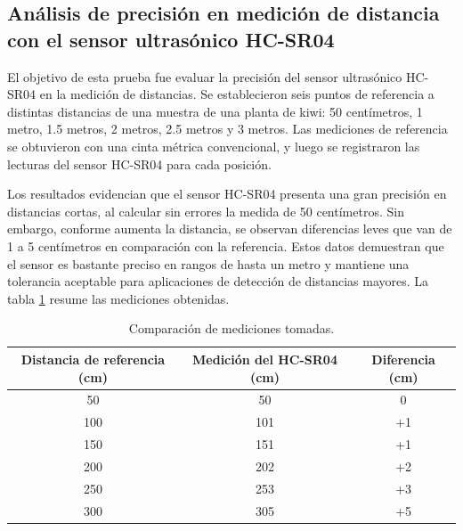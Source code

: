 \vspace{1cm}

\subsection{Análisis de precisión en medición de distancia con el sensor ultrasónico HC-SR04}

El objetivo de esta prueba fue evaluar la precisión del sensor ultrasónico HC-SR04 en la medición de distancias. Se establecieron seis puntos de referencia a distintas distancias de una muestra de una planta de kiwi: 50 centímetros, 1 metro, 1.5 metros, 2 metros, 2.5 metros y 3 metros. Las mediciones de referencia se obtuvieron con una cinta métrica convencional, y luego se registraron las lecturas del sensor HC-SR04 para cada posición.

Los resultados evidencian que el sensor HC-SR04 presenta una gran precisión en distancias cortas, al calcular sin errores la medida de 50 centímetros. Sin embargo, conforme aumenta la distancia, se observan diferencias leves que van de 1 a 5 centímetros en comparación con la referencia. Estos datos demuestran que el sensor es bastante preciso en rangos de hasta un metro y mantiene una tolerancia aceptable para aplicaciones de detección de distancias mayores. La tabla \ref{tab:HCSR04_comparacion} resume las mediciones obtenidas.

\vspace{1cm}

\begin{table}[h]
	\centering
	\caption[Comparación de mediciones tomadas]{Comparación de mediciones tomadas.}
	\begin{tabular}{c c c}    
		\toprule
		\textbf{Distancia de referencia (cm)} 	 & \textbf{Medición del HC-SR04 (cm)} 		& \textbf{Diferencia (cm)}  \\
		\midrule
		50 & 50 & 0 \\		
		100 & 101 & +1 \\	
		150 & 151 & +1 \\	
            200 & 202 & +2 \\	
            250 & 253 & +3 \\	
            300 & 305 & +5 \\	
		\bottomrule
		\hline
	\end{tabular}
	\label{tab:HCSR04_comparacion}
\end{table}

\vspace{1cm}


